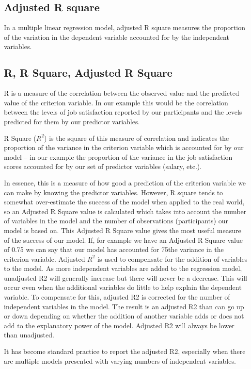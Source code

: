 \documentclass[a4paper,12pt]{article}
\begin{document}
\subsection{Adjusted R square}

In a multiple linear regression model, adjusted R square measures the proportion of the variation in the dependent variable accounted for by the independent variables.


\subsection{R, R Square, Adjusted R Square}

R is a measure of the correlation between the observed value and the predicted value of the criterion variable. In our example this would be the correlation between the levels of job satisfaction reported by our participants and the levels predicted for
them by our predictor variables.

R Square ($R^2$) is the square of this measure of correlation and indicates the proportion of the variance in the criterion variable which is accounted for by our model – in our example the proportion of the variance in the job satisfaction scores accounted for by our set of predictor variables (salary, etc.).

In essence, this is a measure of how good a prediction of the criterion variable we can make by knowing the predictor variables.
However, R square tends to somewhat over-estimate the success of the model when applied to the real world, so an Adjusted R Square value is calculated which takes into account the number of variables in the model and the number of observations (participants) our model is based on. This Adjusted R Square value gives the most useful measure of the success of our model. If, for example we have an Adjusted R Square value of 0.75 we can say that our model has accounted for 75\of the variance in the criterion
variable.
%
Adjusted $R^2$ is used to compensate for the addition of variables to the model.  As more independent variables are added to the regression model, unadjusted R2 will generally increase but there will never be a decrease.  This will occur even when the additional variables do little to help explain the dependent variable.  To compensate for this, adjusted R2 is corrected for the number of independent variables in the model.  The result is an adjusted R2 than can go up or down depending on whether the addition of another variable adds or does not add to the explanatory power of the model.  Adjusted R2 will always be lower than unadjusted.

It has become standard practice to report the adjusted R2, especially when there are multiple models presented with varying numbers of independent variables.
\end{document}
